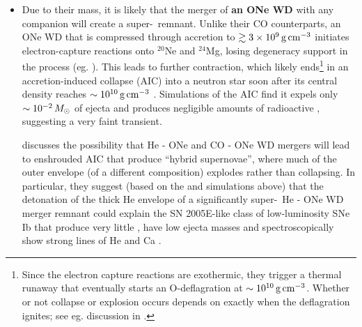 \begin{itemize}


	\item Due to their mass, it is likely that the merger of {\bf an ONe WD} with any companion will create a super-\Mch\ remnant.  Unlike their CO counterparts, an ONe WD that is compressed through accretion to $\gtrsim3\times10^9\,\gcc$ initiates electron-capture reactions onto $^{20}$Ne and $^{24}$Mg, losing degeneracy support in the process (eg. \citealt{miya+80, saion85, schwqb15}).  This leads to further contraction, which likely ends\footnote{Since the electron capture reactions are exothermic, they trigger a thermal runaway that eventually starts an O-deflagration at $\sim10^{10}\,\gcc$.  Whether or not collapse or explosion occurs depends on exactly when the deflagration ignites; see eg. discussion in \cite{schwqb15}.} in an accretion-induced collapse (AIC) into a neutron star soon after its central density reaches $\sim10^{10}\,\gcc$ \citep{schwqb15}.  Simulations \citep{dess+06, dess+07, frye+09} of the AIC find it expels only $\sim10^{-2}\,\Msun$ of ejecta and produces negligible amounts of radioactive \Ni, suggesting a very faint transient.


\cite{dan+14} discusses the possibility that He - ONe and CO - ONe WD mergers will lead to enshrouded AIC that produce ``hybrid supernovae'', where much of the outer envelope (of a different composition) explodes rather than collapsing.  In particular, they suggest (based on the \cite{shen+10he} and \cite{wald+11} simulations above) that the detonation of the thick He envelope of a significantly super-\Mch\ He - ONe WD merger remnant could  explain the SN 2005E-like class of low-luminosity SNe Ib that produce very little \Ni, have low ejecta masses and spectroscopically show strong lines of He and Ca \citep{pere+10}.


\end{itemize}
